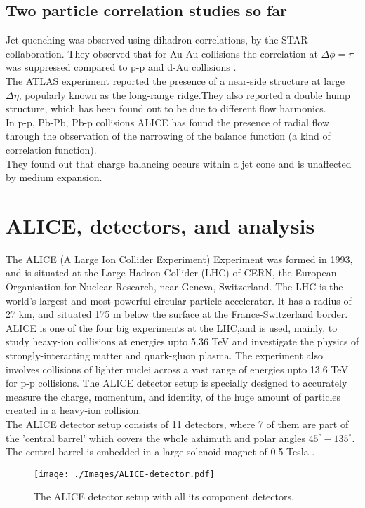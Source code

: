 \documentclass[12pt,a4paper,twoside]{report}
\begin{document}
\subsection{Two particle correlation studies so far}
Jet quenching was observed using dihadron correlations, by the STAR collaboration. They observed that for Au-Au collisions the correlation at $\Delta\phi=\pi$ was suppressed compared to p-p and d-Au collisions \cite{Ref:jetQ-paper1}\cite{Ref:jetQ-paper2}.\\
The ATLAS experiment reported the presence of a near-side structure at large $\Delta\eta$, popularly known as the long-range ridge.They also reported a double hump structure, which has been found out to be due to different flow harmonics.\\
In p-p, Pb-Pb, Pb-p collisions ALICE has found the presence of radial flow through the observation of the narrowing of the balance function (a kind of correlation function).\\ They found out that charge balancing occurs within a jet cone and is unaffected by medium expansion.\\
\section{ALICE, detectors, and analysis}
The ALICE (A Large Ion Collider Experiment) Experiment was formed in 1993, and is situated at the Large Hadron Collider (LHC) of CERN, the European Organisation for Nuclear Research, near Geneva, Switzerland. The LHC is the world's largest and most powerful circular particle accelerator. It has a radius of 27 km, and situated 175 m below the surface at the France-Switzerland border.\\
ALICE is one of the four big experiments at the LHC,and is used, mainly, to study heavy-ion collisions at energies upto 5.36 TeV and investigate the physics of strongly-interacting matter and quark-gluon plasma. The experiment also involves collisions of lighter nuclei across a vast range of energies upto 13.6 TeV for p-p collisions. The ALICE detector setup is specially designed to accurately measure the charge, momentum, and identity, of the huge amount of particles created in a heavy-ion collision.\\
The ALICE detector setup consists of 11 detectors, where 7 of them are part of the 'central barrel' which covers the whole azhimuth and polar angles $45^\circ-135^\circ$. The central barrel is embedded in a large solenoid magnet of 0.5 Tesla \cite{Ref:ALICE-detectors}.\\
\begin{figure}[H]
\texttt{[image: ./Images/ALICE-detector.pdf]}
\caption{The ALICE detector setup with all its component detectors.\cite{Ref:ALICE-detectors}}
\end{figure}
\end{document}
